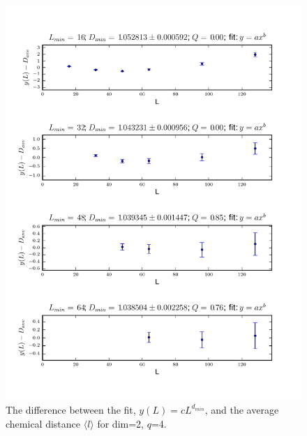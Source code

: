 \documentclass[pre,preprint]{revtex4}
\newcommand{\lb}{{\langle}}
\newcommand{\rb}{{\rangle}}
\begin{document}
\begin{figure}[htp]
\centering
\includegraphics[width=.85\textwidth]{figures/d_min_D2q4_46_fig}
\caption{The difference between the fit, $y(L)=cL^{d_{min}}$, and the average chemical distance $\lb l \rb$ for dim=2, $q$=4.}\label{fig:4}
\end{figure}

\end{document}

